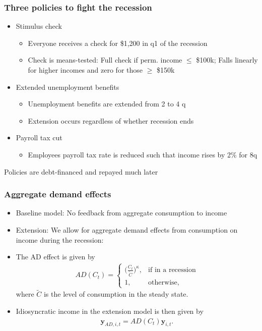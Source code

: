 \documentclass[pdflatex]{beamer}
\begin{document}
\begin{frame}
\frametitle{Three policies to fight the recession}

	\begin{itemize}
	\item Stimulus check
	\begin{itemize}
		\item Everyone receives a check for \$1,200 in q1 of the recession
		\item Check is means-tested: Full check if perm. income $\leq$ \$100k; Falls linearly for higher incomes and zero for those $\geq$ \$150k
	\end{itemize}

	\item Extended unemployment benefits
	\begin{itemize}
		\item Unemployment benefits are extended from 2 to 4 q
		\item Extension occurs regardless of whether recession ends
	\end{itemize}

	\item Payroll tax cut
	\begin{itemize}
		\item Employees payroll tax rate is reduced such that income rises by 2\% for 8q	
	\end{itemize}
\end{itemize}

	Policies are debt-financed and repayed much later


\end{frame}

\begin{frame}
\frametitle{Aggregate demand effects}

\begin{itemize}
	\item Baseline model: No feedback from aggregate consumption to income
	\item Extension: We allow for aggregate demand effects from consumption on income during the recession: 
	
	\item The AD effect is given by
	\begin{align}
		AD(C_t) =   \begin{cases}
		\Big(\frac{C_t}{\tilde{C}}\Big)^\kappa, & \text{if in a recession} \\
		1, & \text{otherwise} ,
		\end{cases}
	\end{align}
	where $\tilde{C}$ is the level of consumption in the steady state. 
	
	\item Idiosyncratic income in the extension model is then given by
	\begin{align}
	\mathbf{y}_{AD,i,t} = AD(C_t)\mathbf{y}_{i,t}.
	\end{align}
	
\end{itemize}

\end{frame}
\end{document}
